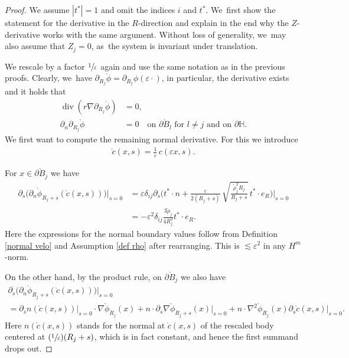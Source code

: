 \documentclass[JEP,XML,SOM,Unicode,published]{cedram}
\let\epsilon\varepsilon
\newcommand{\Psfrac}[2]{(\sfrac{#1}{#2})}
\theoremstyle{definition}
\renewcommand{\div}{\operatorname{div}}
\newcommand\eq{=}
\let\de\partial
\let\eps\epsilon
\begin{document}
\begin{proof}
We assume $|t^*|=1$ and omit the indices $i$ and $t^*$. We~first show the statement for the derivative in the $R$-direction and explain in the end why the $Z$-derivative works with the same argument. Without loss of generality, we~may also assume that $Z_j=0$, as~the system is invariant under translation.

We rescale by a factor $\sfrac{1}{\eps}$ again and use the same notation as in the previous proofs. Clearly, we~have $\de_{R_j}\grave{\phi}=\de_{R_j}\phi(\eps\cdot)$, in particular, the derivative exists and it holds that
\begin{align}
\div(r\nabla\de_{R_j}\grave{\phi})&\eq0,\label{eq deri}\\
\de_n\de_{R_j}\grave{\phi}&\eq0 \quad\text{on $\de\grave{B}_l$ for $l\neq j$ and on $\de\mathbb{H}$}.\label{boundary deri 1}
\end{align}
We first want to compute the remaining normal derivative. For this we introduce
\begin{align*}\grave{c}(x,s)\eq\frac{1}{\eps}\,c(\eps x,s).
\end{align*}

For $x\in \de\grave{B}_j$ we have
\begin{equation}\begin{aligned}\label{s deri 1}
\de_s\bigl(\de_n\grave{\phi}_{R_j+s}(\grave{c}(x,s))\bigr)\big|_{s=0}&\eq\eps\delta_{ij}\de_s\biggl(t^*\cdot n+\frac{\eps}{2(R_j+s)}\,\sqrt{\frac{\tilde{\rho}_j^2R_j}{R_j+s}}\,t^*\cdot e_R \biggr)\bigg|_{s=0}\\
&\eq -\eps^2\delta_{ij}\frac{3\tilde{\rho}_j}{4R_j^2}t^*\cdot e_R.
\end{aligned}\end{equation}
Here the expressions for the normal boundary values follow from Definition \eqref{normal velo} and Assumption \eqref{def rho} after rearranging. This is $\lesssim \eps^2$ in any $H^m$-norm.

On the other hand, by the product rule, on $\de\grave{B}_j$ we also have
\begin{multline}\label{s deri 2}
\de_s\bigl(\de_n\grave{\phi}_{R_j+s}(\grave{c}(x,s))\bigr)\big|_{s=0}\\
\eq\de_s n(\grave{c}(x,s))\big|_{s=0}\cdot\nabla\grave{\phi}_{R_j}(x)+n\cdot\de_{s}\nabla\grave{\phi}_{R_j+s}(x)\big|_{s=0}+n\cdot \nabla^2\grave{\phi}_{R_j}(x)\de_s\grave{c}(x,s)\big|_{s=0}.
\end{multline}
Here $n(\grave{c}(x,s))$ stands for the normal at $\grave{c}(x,s)$ of the rescaled body centered at $\Psfrac{1}{\eps}(R_j+s)$, which is in fact constant, and hence the first summand drops out.


\end{proof}
\end{document}
